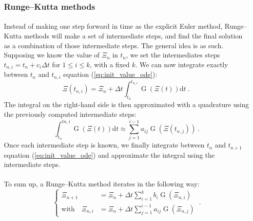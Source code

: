       \subsubsection{Runge--Kutta methods}

        \paragraph{}
        Instead of making one step forward in time as the explicit Euler method, Runge--Kutta methods will make a set of intermediate steps, and find the final solution as a combination of those intermediate steps.
        The general idea is as such.
        Supposing we know the value of $\Xi_n$ in $t_n$, we set the intermediates steps $t_{n, i} = t_n + c_i\Delta t$ for $1 \leq i \leq k$, with a fixed $k$.
        We can now integrate exactly between $t_n$ and $t_{n, i}$ equation (\ref{eq:init_value_ode}):
        \begin{equation}
          \Xi\left(t_{n, i}\right) = \Xi_n + \Delta t \int_{t_n}^{t_{n,i}} \operatorname{G}\left(\Xi\left(t\right)\right) \mathrm{d}t\ .\
        \end{equation}
        The integral on the right-hand side is then approximated with a quadrature using the previously computed intermediate steps:
        \begin{equation}
          \int_{t_n}^{t{n,i}} \operatorname{G}\left(\Xi\left(t\right)\right) \mathrm{d}t \approx \sum_{j = 1}^{i-1} a_{ij} \operatorname{G}\left(\Xi\left(t_{n,j}\right)\right) \ .
        \end{equation}
        Once each intermediate step is known, we finally integrate between $t_n$ and $t_{n+1}$ equation (\ref{eq:init_value_ode}) and approximate the integral using the intermediate steps.

        \paragraph{}
        To sum up, a Runge--Kutta method iterates in the following way:
        \begin{equation}\label{eq:rk}
          \left\{\begin{aligned}
            \Xi_{n+1} &= \Xi_n + \Delta t \sum_{i = 1}^k b_i \operatorname{G}\left(\Xi_{n,i}\right) \\
            \textrm{with}\quad \Xi_{n,i} &= \Xi_n + \Delta t \sum_{j = 1}^{i-1} a_{ij} \operatorname{G}\left(\Xi_{n,j}\right)
          \end{aligned}\right. \ .
        \end{equation}

